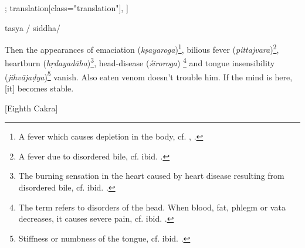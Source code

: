 \begin{alignment}[
  texts=edition[class="edition"];
  translation[class="translation"],
  ]
\begin{edition}
\begin{prose}
tasya
      /
      siddha/
    \end{prose}
  \end{edition}
  \begin{translation}
    \begin{tlate}
      Then the appearances of emaciation (\textit{kṣayaroga})\footnote{A fever which causes depletion in the body, cf.  , \citeauthor[1968: 441-442]{ayurveda}.}, bilious fever (\textit{pittajvara})\footnote{A fever due to disordered bile, cf. ibid. \citeauthor[1968: 618]{ayurveda}.}, heartburn (\textit{hṛdayadāha})\footnote{The burning sensation in the heart caused by heart disease resulting from disordered bile, cf. ibid. \citeauthor[1968: 1721]{ayurveda}.}, head-disease (\textit{śiroroga}) \footnote{The term refers to disorders of the head. When blood, fat, phlegm or vata decreases, it causes severe pain, cf. ibid. \citeauthor[1968: 1452]{ayurveda}.} and tongue insensibility (\textit{jihvājaḍya})\footnote{Stiffness or numbness of the tongue, cf. ibid. \citeauthor[1968: 1452]{ayurveda}.} vanish. Also eaten venom doesn't trouble him. If the mind is here, [it] becomes stable.
      \end{tlate}
    \bigskip
    \centerline{\textrm{\small{[Eighth Cakra]}}}
    \bigskip
    \begin{tlate}

\end{tlate}
\end{translation}
\end{alignment}
